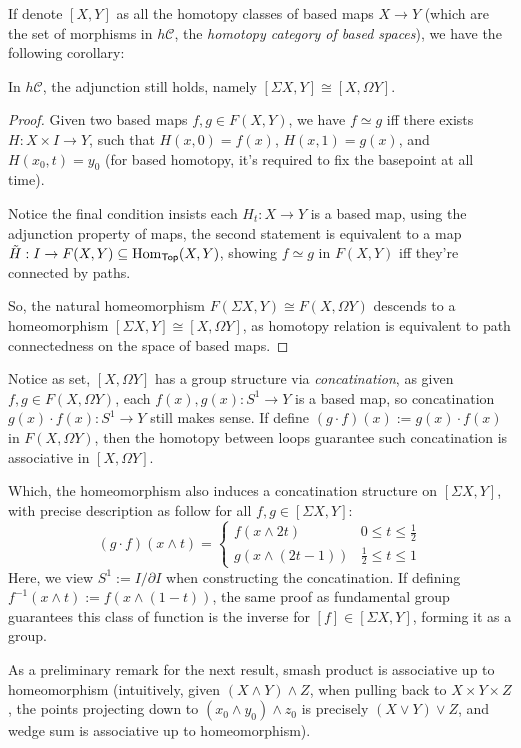 \documentclass{article}
\begin{document}
If denote $[X,Y]$ as all the homotopy classes of based maps $X\rightarrow Y$ (which are the set of morphisms in $h\mathcal{C}$, the \emph{homotopy category of based spaces}), we have the following corollary:
\begin{cor}
    In $h\mathcal{C}$, the adjunction still holds, namely $[\Sigma X,Y]\cong [X,\Omega Y]$.
\end{cor}
\begin{proof}
    Given two based maps $f,g\in F(X,Y)$, we have $f\simeq g$ iff there exists $H:X\times I\rightarrow Y$, such that $H(x,0)=f(x)$, $H(x,1)=g(x)$, and $H(x_0,t)=y_0$ (for based homotopy, it's required to fix the basepoint at all time).
    
    Notice the final condition insists each $H_t:X\rightarrow Y$ is a based map, using the adjunction property of maps, the second statement is equivalent to a map $\tilde{H}:I\rightarrow F(X,Y)\subseteq \mathrm{Hom}_{\mathsf{Top}} (X,Y)$, showing $f\simeq g$ in $F(X,Y)$ iff they're connected by paths.

    So, the natural homeomorphism $F(\Sigma X,Y)\cong F(X,\Omega Y)$ descends to a homeomorphism $[\Sigma X,Y]\cong [X,\Omega Y]$, as homotopy relation is equivalent to path connectedness on the space of based maps.
\end{proof}

\hfil

Notice as set, $[X,\Omega Y]$ has a group structure via \emph{concatination}, as given $f,g\in F(X,\Omega Y)$, each $f(x),g(x):S^1\rightarrow Y$ is a based map, so concatination $g(x)\cdot f(x):S^1\rightarrow Y$ still makes sense. If define $(g\cdot f)(x):= g(x)\cdot f(x)$ in $F(X,\Omega Y)$, then the homotopy between loops guarantee such concatination is associative in $[X,\Omega Y]$. 

Which, the homeomorphism also induces a concatination structure on $[\Sigma X,Y]$, with precise description as follow for all $f,g\in [\Sigma X,Y]$:
\[(g\cdot f)(x\wedge t) = \begin{cases}
    f(x\wedge 2t) & 0\leq t\leq \frac{1}{2}\\
    g(x\wedge (2t-1)) & \frac{1}{2}\leq t\leq 1
\end{cases}\]
Here, we view $S^1 := I/ \partial I$ when constructing the concatination. If defining $f^{-1}(x\wedge t):= f(x\wedge (1-t))$, the same proof as fundamental group guarantees this class of function is the inverse for $[f]\in [\Sigma X,Y]$, forming it as a group.

As a preliminary remark for the next result, smash product is associative up to homeomorphism (intuitively, given $(X\wedge Y)\wedge Z$, when pulling back to $X\times Y\times Z$, the points projecting down to $(x_0\wedge y_0)\wedge z_0$ is precisely $(X\vee Y)\vee Z$, and wedge sum is associative up to homeomorphism).
\end{document}
